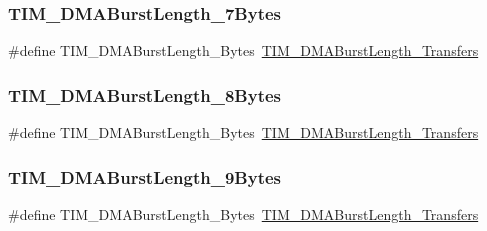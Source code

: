 \mbox{\label{group___t_i_m___legacy_ga5833cc5442c40a97a6a90bcd34a2e773}} 
\subsubsection{\texorpdfstring{TIM\_DMABurstLength\_7Bytes}{TIM\_DMABurstLength\_7Bytes}}
{\footnotesize\ttfamily \#define T\+I\+M\+\_\+\+D\+M\+A\+Burst\+Length\+\_\+Bytes~\mbox{\hyperlink{group___t_i_m___d_m_a___burst___length_gaf2ae83bd73b0e92b73e5ebfc11f9bfad}{T\+I\+M\+\_\+\+D\+M\+A\+Burst\+Length\+\_\+Transfers}}}

\mbox{\label{group___t_i_m___legacy_gab7c002a9f06f7c238e15a0c61f047062}} 
\subsubsection{\texorpdfstring{TIM\_DMABurstLength\_8Bytes}{TIM\_DMABurstLength\_8Bytes}}
{\footnotesize\ttfamily \#define T\+I\+M\+\_\+\+D\+M\+A\+Burst\+Length\+\_\+Bytes~\mbox{\hyperlink{group___t_i_m___d_m_a___burst___length_ga8a760d7114425596736b0ecdbe5fdea6}{T\+I\+M\+\_\+\+D\+M\+A\+Burst\+Length\+\_\+Transfers}}}

\mbox{\label{group___t_i_m___legacy_ga2868d400329e705b89c1e425c9cb4fed}} 
\subsubsection{\texorpdfstring{TIM\_DMABurstLength\_9Bytes}{TIM\_DMABurstLength\_9Bytes}}
{\footnotesize\ttfamily \#define T\+I\+M\+\_\+\+D\+M\+A\+Burst\+Length\+\_\+Bytes~\mbox{\hyperlink{group___t_i_m___d_m_a___burst___length_ga98b208205c133557a9d67a0921559a66}{T\+I\+M\+\_\+\+D\+M\+A\+Burst\+Length\+\_\+Transfers}}}

